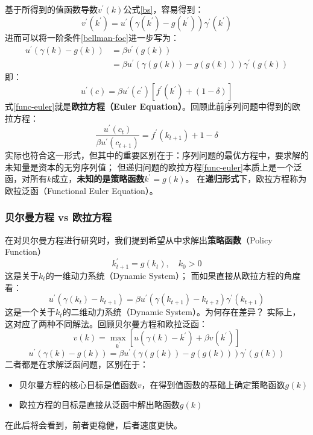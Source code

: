 基于所得到的值函数导数$v^{\prime}\left(k\right)$公式\eqref{bs}，容易得到：
$$
v^{\prime}\left(k^{\prime}\right)
    =u^{\prime}\left(\gamma\left(k^{\prime}\right)-g\left(k^{\prime}\right)\right)\gamma^{\prime}\left(k^{\prime}\right)
$$
进而可以将一阶条件\eqref{bellman-foc}进一步写为：
\begin{align}
    u^{\prime}\left(\gamma\left(k\right)-g\left(k\right)\right) 
        &= \beta v^{\prime}\left(g\left(k\right)\right) \nonumber    \\
        &= \beta u^{\prime}\left(\gamma\left(g\left(k\right)\right)-g\left(g\left(k\right)\right)\right)
            \gamma^{\prime}\left(g\left(k\right)\right) \label{func-euler}
\end{align}
即：
\begin{equation*}
    u^{\prime}\left(c\right)=\beta u^{\prime}\left(c^{\prime}\right)\left[f^{\prime}\left(k^{\prime}\right)+\left(1-\delta\right)\right]
\end{equation*}
式\eqref{func-euler}就是\textbf{欧拉方程（Euler Equation）}。回顾此前序列问题中得到的欧拉方程：
$$
\frac{u^{\prime}\left(c_t\right)}{\beta u^{\prime}\left(c_{t+1}\right)}=f^{\prime}\left(k_{t+1}\right)+1-\delta
$$
实际也符合这一形式，但其中的重要区别在于：序列问题的最优方程中，要求解的未知量是资本的无穷序列值；
但递归问题的欧拉方程\eqref{func-euler}本质上是一个泛函，对所有$k$成立，\textbf{未知的是策略函数}$k^{\prime}=g\left(k\right)$。
在\textbf{递归形式}下，欧拉方程称为欧拉泛函（Functional Euler Equation）。


\subsubsection{贝尔曼方程 vs 欧拉方程}
在对贝尔曼方程进行研究时，我们提到希望从中求解出\textbf{策略函数}（Policy Function）
$$
k^{\prime}_{t+1}=g\left(k_t\right), \quad k_0>0
$$
这是关于$k_t$的一维动力系统（Dynamic System）；
而如果直接从欧拉方程的角度看：
$$u^{\prime}\left(\gamma\left(k_t\right)-k_{t+1}\right) 
        = \beta u^{\prime}\left(\gamma\left(k_{t+1}\right)-k_{t+2}\right)
            \gamma^{\prime}\left(k_{t+1}\right)
$$
这是一个关于$k_t$的二维动力系统（Dynamic System）。为何存在差异？
实际上，这对应了两种不同解法。回顾贝尔曼方程和欧拉泛函：
$$
v\left(k\right)=\max _{k^{\prime}}\left[u\left(\gamma\left(k\right)-k^{\prime}\right)+\beta v\left(k^{\prime}\right)\right]
$$
$$u^{\prime}\left(\gamma\left(k\right)-g\left(k\right)\right) 
        = \beta u^{\prime}\left(\gamma\left(g\left(k\right)\right)-g\left(g\left(k\right)\right)\right)
            \gamma^{\prime}\left(g\left(k\right)\right)
$$
二者都是在求解泛函问题，区别在于：
\begin{itemize}
    \item 贝尔曼方程的核心目标是值函数$v$，在得到值函数的基础上确定策略函数$g\left(k\right)$
    \item 欧拉方程的目标是直接从泛函中解出略函数$g\left(k\right)$
\end{itemize}
在此后将会看到，前者更稳健，后者速度更快。

